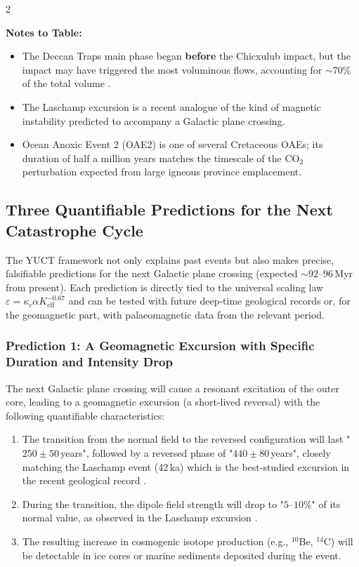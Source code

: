 \documentclass[11pt,a4paper]{article}
\begin{document}
	\begin{multicols}{2}
		
		\noindent
		\textbf{Notes to Table:}
		\begin{itemize}
			\item The Deccan Traps main phase began \textbf{before} the Chicxulub impact, 
			but the impact may have triggered the most voluminous flows, accounting for 
			\(\sim 70\%\) of the total volume \cite{DeccanTriggering}.
			\item The Laschamp excursion is a recent analogue of the kind of magnetic
			instability predicted to accompany a Galactic plane crossing.
			\item Ocean Anoxic Event 2 (OAE2) is one of several Cretaceous OAEs; its
			duration of half a million years matches the timescale of the CO\(_2\)
			perturbation expected from large igneous province emplacement.
		\end{itemize}
		
		
		\subsection{Three Quantifiable Predictions for the Next Catastrophe Cycle}
		
		The YUCT framework not only explains past events but also makes precise,
		falsifiable predictions for the next Galactic plane crossing (expected
		\(\sim 92\)–\(96\) Myr from present). Each prediction is directly tied
		to the universal scaling law \(\varepsilon = \kappa_c \alpha K_{\mathrm{eff}}^{-0.67}\)
		and can be tested with future deep‑time geological records or, for the
		geomagnetic part, with palaeomagnetic data from the relevant period.
		
		\subsubsection{Prediction 1: A Geomagnetic Excursion with Specific Duration and Intensity Drop}
		
		The next Galactic plane crossing will cause a resonant excitation of the
		outer core, leading to a geomagnetic excursion (a short‑lived reversal)
		with the following quantifiable characteristics:
		
		\begin{enumerate}
			\item The transition from the normal field to the reversed configuration
			will last "\(250 \pm 50\) years", followed by a reversed phase of
			"\(440 \pm 80\) years", closely matching the Laschamp event
			(42 ka) which is the best‑studied excursion in the recent geological
			record \cite{Laschamp}.
			\item During the transition, the dipole field strength will drop to
			"\(5\)–\(10\%\)" of its normal value, as observed in the Laschamp
			excursion \cite{Laschamp}.
			\item The resulting increase in cosmogenic isotope production
			(e.g., \(^{10}\)Be, \(^{14}\)C) will be detectable in ice cores or
			marine sediments deposited during the event.
		\end{enumerate}
		

\end{multicols}
\end{document}
